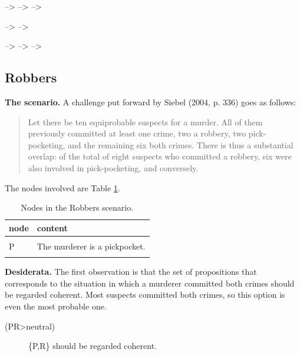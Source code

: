 \documentclass[
  10pt,
]{scrartcl}
\newcommand{\s}[1]{\textsf{#1}}
\begin{document}
--\textgreater{}
--\textgreater{}
--\textgreater{}

--\textgreater{}
--\textgreater{}

--\textgreater{}
--\textgreater{}
--\textgreater{}

\hypertarget{robbers}{%
\subsection{Robbers}\label{robbers}}

\textbf{The scenario.} A challenge put forward by Siebel (2004, p. 336) goes as follows:

\begin{quote}
    Let there be ten equiprobable suspects for a murder. All of them previously committed at least one crime, two a robbery, two pick-pocketing, and the remaining six both crimes. There is thus a substantial overlap: of the total of eight suspects who committed a robbery, six were also involved in pick-pocketing, and conversely. 
\end{quote}

\noindent The nodes involved are Table \ref{tab:robbersPropositions}.

\begin{table}[H]

\caption{\label{tab:robbersPropositions}Nodes in the Robbers scenario.}
\centering
\begin{tabular}[t]{ll}
\toprule
node & content\\
\midrule
\cellcolor{gray!6}{W} & \cellcolor{gray!6}{Real perpetrator status (states: OnlyP, OnlyR, Both).}\\
P & The murderer is a pickpocket.\\
\cellcolor{gray!6}{R} & \cellcolor{gray!6}{The murderer is a robber.}\\
\bottomrule
\end{tabular}
\end{table}

\noindent  \textbf{Desiderata.} The first observation is that the set of propositions that corresponds to the situation in which a murderer committed both crimes should be regarded coherent. Most suspects committed both crimes, so this option is even the most probable one.
\vspace{2mm}

\begin{description}
    \item[(\s{PR}\textgreater \s{neutral})] \{\s{P,R}\} should be regarded coherent. 
\end{description}\vspace{2mm}
\end{document}
